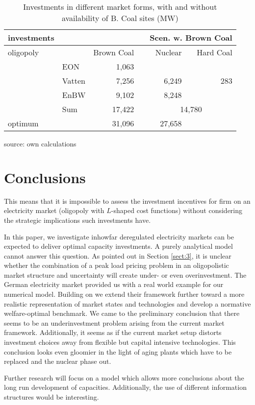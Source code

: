 \begin{table}
\centering
\caption{Investments in different market forms, with and without availability of B. Coal sites (MW)}
\begin{tabular}{llrrrr}
\hline
\hline
investments &            &            &            & \multicolumn{ 2}{r}{Scen. w. Brown Coal} \\
\hline
 oligopoly &            & Brown Coal &            &    Nuclear &  Hard Coal \\
\hline
           &        EON &       1,063 &            &            &            \\
           &     Vatten &       7,256 &            &       6,249 &        283 \\
           &       EnBW &       9,102 &            &       8,248 &            \\
           &        Sum &      17,422 &            & \multicolumn{ 2}{c}{14,780} \\
\hline
   optimum &            &      31,096 &            &      27,658 &            \\
\hline
\hline
\end{tabular}  

\label{tab:invest}
\begin{center}
source: own calculations
\end{center}
\end{table}

\section{Conclusions}

This means that it is impossible to assess the investment incentives for firm on an electricity market (oligopoly with $L$-shaped cost functions) without considering the strategic implications such investments have.

In this paper, we investigate inhowfar deregulated electricity markets can be expected to deliver optimal capacity investments. A purely analytical model cannot answer this question. As pointed out in Section \ref{sect:3}, it is unclear whether the combination of a peak load pricing problem in an oligopolistic market structure and uncertainty will create under- or even overinvestment. The German electricity market provided us with a real world example for our numerical model. Building on \cite{Genc2007} we extend their framework further toward a more realistic representation of market states and technologies and develop a normative welfare-optimal benchmark. We came to the preliminary conclusion that there seems to be an underinvestment problem arising from the current market framework. Additionally, it seems as if the current market setup distorts investment choices away from flexible but capital intensive technologies. This conclusion looks even gloomier in the light of aging plants which have to be replaced and the nuclear phase out.

Further research will focus on a model which allows more conclusions about the long run development of capacities. Additionally, the use of different information structures would be interesting.


 

